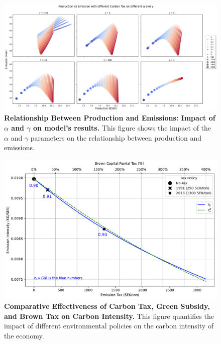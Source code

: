 \documentclass[11pt]{article}
\begin{document}
\vfill
\begin{figure}[!htb]
\centerline{\includegraphics[width=7in]{Figures/production_emission.pdf}}
\caption{{\bf Relationship Between Production and Emissions: Impact of $\alpha$ and $\gamma$ on model's results.} This figure shows the impact of the $\alpha$ and $\gamma$ parameters on the relationship between production and emissions.}
\label{fig:production_emission}
\end{figure}
\vfill



\vfill
\begin{figure}[!htb]
\centerline{\includegraphics[width=7in]{Figures/intensity_tax_premium.pdf}}
\caption{{\bf Comparative Effectiveness of Carbon Tax, Green Subsidy, and Brown Tax on Carbon Intensity.} This figure quantifies the impact of different environmental policies on the carbon intensity of the economy.} \label{fig:intensity_tax_premium}
\end{figure}
\vfill
\end{document}
